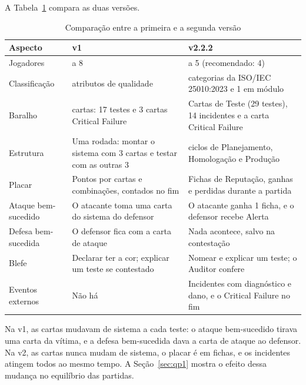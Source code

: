 A Tabela~\ref{tab:v1v2} compara as duas versões.

\begin{table}[ht]
  \centering
  \caption{Comparação entre a primeira e a segunda versão}
  \label{tab:v1v2}
  \footnotesize
  \begin{tabularx}{\linewidth}{>{\raggedright\arraybackslash}p{2.6cm} >{\raggedright\arraybackslash}X >{\raggedright\arraybackslash}X}
    \toprule
    Aspecto & v1 \cite{oliveira2025critical} & v2.2.2 \\
    \midrule
    Jogadores & 3 a 8 & 4 a 5 (recomendado: 4) \\
    Classificação & 6 atributos de qualidade & 7 categorias da ISO/IEC 25010:2023 e 1 em módulo \\
    Baralho & 54 cartas: 17 testes e 3 cartas Critical Failure & 63 Cartas de Teste (29 testes), 14 incidentes e a carta Critical Failure \\
    Estrutura & Uma rodada: montar o sistema com 3 cartas e testar com as outras 3 & 3 ciclos de Planejamento, Homologação e Produção \\
    Placar & Pontos por cartas e combinações, contados no fim & Fichas de Reputação, ganhas e perdidas durante a partida \\
    Ataque bem-sucedido & O atacante toma uma carta do sistema do defensor & O atacante ganha 1 ficha, e o defensor recebe Alerta \\
    Defesa bem-sucedida & O defensor fica com a carta de ataque & Nada acontece, salvo na contestação \\
    Blefe & Declarar ter a cor; explicar um teste se contestado & Nomear e explicar um teste; o Auditor confere \\
    Eventos externos & Não há & Incidentes com diagnóstico e dano, e o Critical Failure no fim \\
    \bottomrule
  \end{tabularx}
\end{table}

Na v1, as cartas mudavam de sistema a cada teste: o ataque bem-sucedido tirava uma carta da vítima, e a defesa
bem-sucedida dava a carta de ataque ao defensor. Na v2, as cartas nunca mudam de sistema, o placar é em fichas, e
os incidentes atingem todos ao mesmo tempo. A Seção~\ref{sec:qp1} mostra o efeito dessa mudança no equilíbrio
das partidas.

